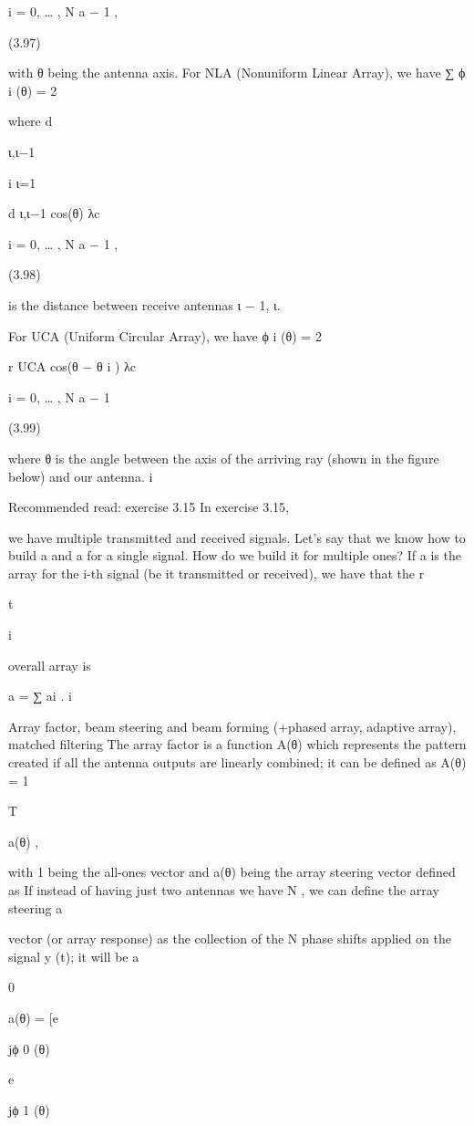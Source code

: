 {{{{i = 0, … , N a − 1 ,

(3.97)

with θ being the antenna axis.
For NLA (Nonuniform Linear Array), we have
∑
ϕ i (θ) = 2\pi

where d

ι,ι−1

i ι=1

d ι,ι−1 cos(θ)
λc

i = 0, … , N a − 1 ,

(3.98)

is the distance between receive antennas ι − 1, ι.

For UCA (Uniform Circular Array), we have ϕ i (θ) = 2\pi

r UCA cos(θ − θ i )
λc

i = 0, … , N a − 1

(3.99)

where θ is the angle between the axis of the arriving ray (shown in the figure below) and our antenna.
i

Recommended read: exercise 3.15 In exercise 3.15,

we have multiple transmitted and received signals. Let's say that we know how to build a and a for a single signal. How do we build it for multiple ones?
If a is the array for the i-th signal (be it transmitted or received), we have that the r

t

i

overall array is

a = ∑ ai .
i

Array factor, beam steering and beam forming (+phased array,
adaptive array), matched filtering The array factor is a function A(θ) which represents the pattern created if all the antenna outputs are linearly combined; it can be defined as A(θ) = 1

T

a(θ) ,

with 1 being the all-ones vector and a(θ) being the array steering vector defined as If instead of having just two antennas we have N , we can define the array steering a

vector (or array response) as the collection of the N phase shifts applied on the signal y (t); it will be a

0

a(θ) = [e

jϕ 0 (θ)

e

jϕ 1 (θ)

}}}}
